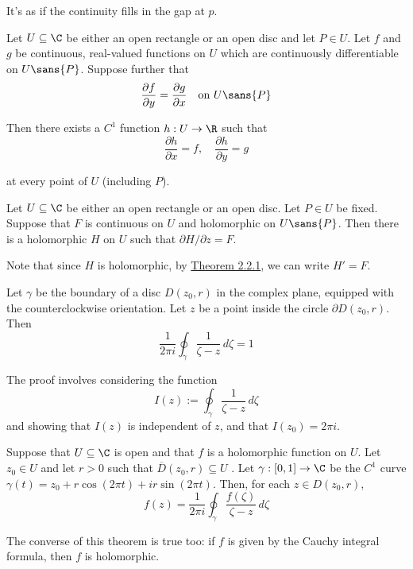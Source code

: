 It's as if the continuity fills in the gap at $p$.

\label{f017dd0}

Let $U\subseteq\C$ be either an open rectangle or an open disc and let $P\in
U$. Let $f$ and $g$ be continuous, real-valued functions on $U$ which are
continuously differentiable on $U\sans{P}$. Suppose further that
$$
  \frac{\partial f}{\partial y}=\frac{\partial g}{\partial x}
  \quad\text{on }U\sans{P}
$$

Then there exists a $C^1$ function $h:U\to\R$ such that
$$
  \frac{\partial h}{\partial x}=f,\quad
  \frac{\partial h}{\partial y}=g
$$

at every point of $U$ (including $P$).

\label{b2d9d89}

Let $U\subseteq\C$ be either an open rectangle or an open disc. Let $P\in U$ be
fixed. Suppose that $F$ is continuous on $U$ and holomorphic on $U\sans{P}$.
Then there is a holomorphic $H$ on $U$ such that $\partial H/\partial z=F$.

Note that since $H$ is holomorphic, by \href{f75e43c}{Theorem 2.2.1}, we can
write $H'=F$.

\label{c6c594a}

Let $\gamma$ be the boundary of a disc $D(z_0,r)$ in the complex plane,
equipped with the counterclockwise orientation. Let $z$ be a point inside the
circle $\partial D(z_0,r)$. Then
$$
  \frac1{2\pi i}\oint_\gamma\frac1{\zeta-z}\,d\zeta=1
$$

The proof involves considering the function
$$
  I(z):=\oint_\gamma\frac1{\zeta-z}\,d\zeta
$$
and showing that $I(z)$ is independent of $z$, and that $I(z_0)=2\pi i$.

\label{e50677f}

Suppose that $U\subseteq\C$ is open and that $f$ is a holomorphic function on
$U$. Let $z_0\in U$ and let $r>0$ such that $\overline D(z_0,r)\subseteq U$ .
Let $\gamma:[0,1]\to\C$ be the $C^1$ curve $\gamma(t)=z_0+r\cos(2\pi
t)+ir\sin(2\pi t)$. Then, for each $z\in D(z_0,r)$,
$$
  f(z)=\frac1{2\pi i}\oint_\gamma\frac{f(\zeta)}{\zeta-z}\,d\zeta
$$

The converse of this theorem is true too: if $f$ is given by the Cauchy
integral formula, then $f$ is holomorphic.

\label{da0d68d}

